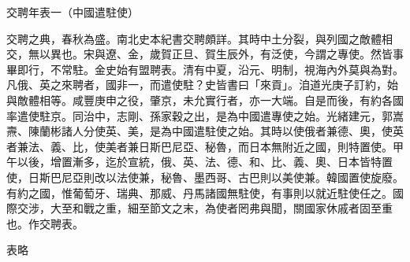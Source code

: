 
\begin{pinyinscope}
交聘年表一（中國遣駐使）

交聘之典，春秋為盛。南北史本紀書交聘頗詳。其時中土分裂，與列國之敵體相交，無以異也。宋與遼、金，歲賀正旦、賀生辰外，有泛使，今謂之專使。然皆事畢即行，不常駐。金史始有盟聘表。清有中夏，沿元、明制，視海內外莫與為對。凡俄、英之來聘者，國非一，而遣使駐？史皆書曰「來貢」。洎道光庚子訂約，始與敵體相等。咸豐庚申之役，肇京，未允實行者，亦一大端。自是而後，有約各國率遣使駐京。同治中，志剛、孫家穀之出，是為中國遣專使之始。光緒建元，郭嵩燾、陳蘭彬諸人分使英、美，是為中國遣駐使之始。其時以使俄者兼德、奧，使英者兼法、義、比，使美者兼日斯巴尼亞、秘魯，而日本無附近之國，則特置使。甲午以後，增置漸多，迄於宣統，俄、英、法、德、和、比、義、奧、日本皆特置使，日斯巴尼亞則改以法使兼，秘魯、墨西哥、古巴則以美使兼。韓國置使旋廢。有約之國，惟葡萄牙、瑞典、那威、丹馬諸國無駐使，有事則以就近駐使任之。國際交涉，大至和戰之重，細至節文之末，為使者罔弗與聞，關國家休戚者固至重也。作交聘表。

表略


\end{pinyinscope}